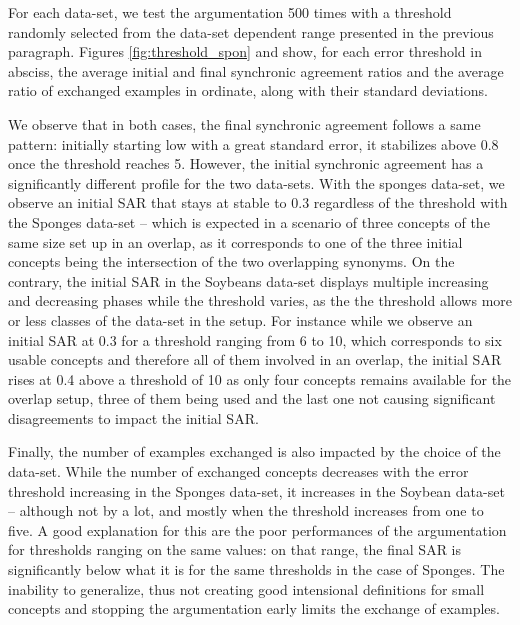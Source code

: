 For each data-set, we test the argumentation 500 times with a threshold randomly selected from the data-set dependent range presented in the previous paragraph. Figures \ref{fig:threshold_spon} and show, for each error threshold in absciss, the average initial and final synchronic agreement ratios and the average ratio of exchanged examples in ordinate, along with their standard deviations.

We observe that in both cases, the final synchronic agreement follows a same pattern: initially starting low with a great standard error, it stabilizes above 0.8 once the threshold reaches 5. However, the initial synchronic agreement has a significantly different profile for the two data-sets. With the sponges data-set, we observe an initial SAR that stays at stable to 0.3 regardless of the threshold with the Sponges data-set -- which is expected in a scenario of three concepts of the same size set up in an overlap, as it corresponds to one of the three initial concepts being the intersection of the two overlapping synonyms. On the contrary, the initial SAR in the Soybeans data-set displays multiple increasing and decreasing phases while the threshold varies, as the the threshold allows more or less classes of the data-set in the setup. For instance while we observe an initial SAR at 0.3 for a threshold ranging from 6 to 10, which corresponds to six usable concepts and therefore all of them involved in an overlap, the initial SAR rises at 0.4 above a threshold of 10 as only four concepts remains available for the overlap setup, three of them being used and the last one not causing significant disagreements to impact the initial SAR.

Finally, the number of examples exchanged is also impacted by the choice of the data-set. While the number of exchanged concepts decreases with the error threshold increasing in the Sponges data-set, it increases in the Soybean data-set -- although not by a lot, and mostly when the threshold increases from one to five. A good explanation for this are the poor performances of the argumentation for thresholds ranging on the same values: on that range, the final SAR is significantly below what it is for the same thresholds in the case of Sponges. The inability to generalize, thus not creating good intensional definitions for small concepts and stopping the argumentation early limits the exchange of examples.
